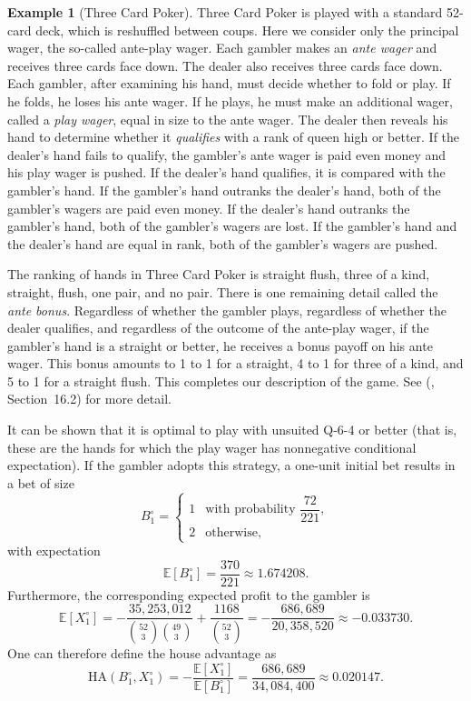 \documentclass{article}
\theoremstyle{definition}
\newtheorem{example}[theorem]{Example}
\theoremstyle{remark}
\newcommand{\E}{\mathbb{E}}
\newcommand{\HA}{\mathrm{HA}}
\begin{document}
\begin{example}[Three Card Poker]\label{example:poker} Three Card Poker is played with a standard 52-card deck, which is reshuffled between coups.  Here we consider only the principal wager, the so-called ante-play wager.  Each gambler makes an \textit{ante wager} and receives three cards face down. The dealer also receives three cards face down.  Each gambler, after examining his hand, must decide whether to fold or play.  If he folds, he loses his ante wager.  If he plays, he must make an additional wager, called a \textit{play wager}, equal in size to the ante wager.  The dealer then reveals his hand to determine whether it \textit{qualifies} with a rank of queen high or better.  If the dealer's hand fails to qualify, the gambler's ante wager is paid even money and his play wager is pushed.  If the dealer's hand qualifies, it is compared with the gambler's hand.  If the gambler's hand outranks the dealer's hand, both of the gambler's wagers are paid even money.  If the dealer's hand outranks the gambler's hand, both of the gambler's wagers are lost.   If the gambler's hand and the dealer's hand are equal in rank, both of the gambler's wagers are pushed.

The ranking of hands in Three Card Poker is straight flush, three of a kind, straight, flush, one pair, and no pair.  There is one remaining detail called the \textit{ante bonus}.  Regardless of whether the gambler plays, regardless of whether the dealer qualifies, and regardless of the outcome of the ante-play wager, if the gambler's hand is a straight or better, he receives a bonus payoff on his ante wager.  This bonus amounts to 1 to 1 for a straight, 4 to 1 for three of a kind, and 5 to 1 for a straight flush.  This completes our description of the game.  See \citeauthor{E10} (\citeyear{E10}, Section~16.2) for more detail.

It can be shown that it is optimal to play with unsuited Q-6-4 or better (that is, these are the hands for which the play wager has nonnegative conditional expectation).  If the gambler adopts this strategy, a one-unit initial bet results in a bet of size
\[
B_1^\circ=\begin{cases}1&\text{with probability $\dfrac{72}{221}$},\\ 2&\text{otherwise},\end{cases}
\]
with expectation
\[
\E[B_1^\circ]=\frac{370}{221}\approx1.674208.
\]
Furthermore, the corresponding expected profit to the gambler is
\[
\E[X_1^\circ]=-\frac{35{,}253{,}012}{\binom{52}{3}\binom{49}{3}}+\frac{1168}{\binom{52}{3}}=-\frac{686{,}689}{20{,}358{,}520}\approx-0.033730.
\]
One can therefore define the house advantage as
\[
\HA(B_1^\circ,X_1^\circ)=-\frac{\E[X_1^\circ]}{\E[B_1^\circ]}=\frac{686{,}689}{34{,}084{,}400}\approx0.020147.
\]
\end{example}
\end{document}
